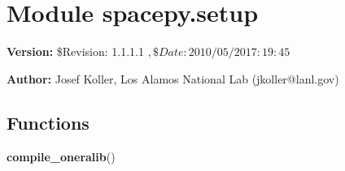 %
%
%


\section{Module spacepy.setup}

    \label{spacepy:setup}
\textbf{Version:} \$Revision: 1.1.1.1 $, \$Date: 2010/05/20 17:19:45 $



\textbf{Author:} Josef Koller, Los Alamos National Lab (jkoller@lanl.gov)





  \subsection{Functions}

    \label{spacepy:setup:compile_oneralib}

    \vspace{0.5ex}

\hspace{.8\funcindent}\begin{boxedminipage}{\funcwidth}

    \raggedright \textbf{compile\_oneralib}()

\setlength{\parskip}{2ex}
\setlength{\parskip}{1ex}
    \end{boxedminipage}

    \label{spacepy:setup:subst}

    \vspace{0.5ex}

